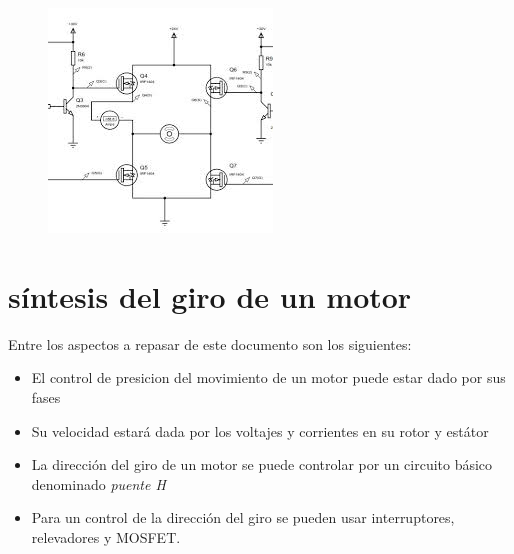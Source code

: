 \documentclass[11pt,a4paper]{article}
\begin{document}
\begin{figure}[h]
\begin{center}
\includegraphics[scale=0.8]{6.png}
\end{center}
\end{figure}


\section{síntesis del giro de un motor}

Entre los aspectos a repasar de este documento son los siguientes:

\begin{itemize}

\item El control de presicion del movimiento de un motor puede estar dado por sus fases
\item Su velocidad estará dada por los voltajes y corrientes en su rotor y estátor
\item La dirección del giro de un motor se puede controlar por un circuito básico denominado \emph{puente H}
\item Para un control de la dirección del giro se pueden usar interruptores, relevadores y MOSFET. 


 





\end{itemize}
\end{document}
